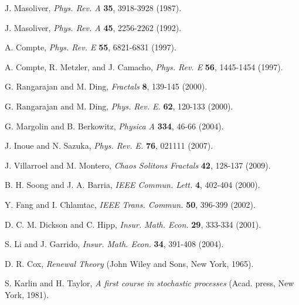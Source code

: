 \documentclass[english,aps,a4paper,twocolumn,showpacs,showkeys,amsfonts,amsmath,amssymb,amscd,nofootinbib]{revtex4}
\def\Journal#1#2#3#4#5#6{{#1}, {\it #4} \textbf{#5}, #6 (#2).}
\def\Book#1#2#3#4#5{{#1}, {\it #3} (#4, #5, #2).}
\newcommand{\1}{\'\i}
\begin{document}
\begin{thebibliography}{00}
 \Journal{J. Masoliver}{1987}{First passage times for non-Markovian processes: Shot noise}{Phys. Rev. A}{35}{3918-3928}

 \Journal{J. Masoliver}{1992}{Mean first-passage times for non-Markovian continuous noise}{Phys. Rev. A}{45}{2256-2262}

 \Journal{A. Compte}{1997}{Continuous time random walks on moving fluids}{Phys. Rev. E}{55}{6821-6831}

 \Journal{A. Compte, R. Metzler, and J. Camacho}{1997}{Biased continuous time random walks between parallel plates}{Phys. Rev. E}{56}{1445-1454}

 \Journal{G. Rangarajan and M. Ding}{2000}{First passage time problem for biased CTRWs}{Fractals}{8}{139-145}

 \Journal{G. Rangarajan and M. Ding}{2000}{Anomalous diffusion and the first passage time problem}{Phys. Rev. E.}{62}{120-133}

 \Journal{G. Margolin and B. Berkowitz}{2004}{}{Physica A}{334}{46-66}%

 \Journal{J. Inoue and N. Sazuka}{2007}{Crossover between Levy and Gaussian regimes in first-passage processes}{Phys. Rev. E.}{76}{021111}

 \Journal{J. Villarroel and M. Montero}{2009}{}{Chaos Solitons Fractals}{42}{128-137}%

 \Journal{B. H. Soong and J. A. Barria}{2000}{}{IEEE Commun. Lett.}{4}{402-404}%

 \Journal{Y. Fang and I. Chlamtac}{2002}{}{IEEE Trans. Commun.}{50}{396-399}%

 \Journal{D. C. M. Dickson and C. Hipp}{2001}{}{Insur. Math. Econ.}{29}{333-334}%

 \Journal{S. Li and J. Garrido}{2004}{On ruin for the Erlang(n) risk process}{Insur. Math. Econ.}{34}{391-408}%

 \Book{D. R. Cox}{1965}{Renewal Theory}{John Wiley and Sons}{New York}%

 \Book{S. Karlin and H. Taylor}{1981}{A  first course in stochastic processes}{Acad. press}{New York}%





\end{thebibliography}
\end{document}
